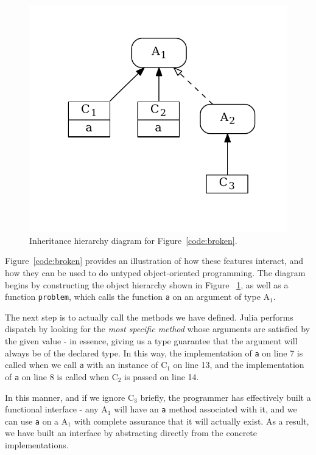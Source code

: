 \documentclass[preprint]{sigplanconf}
\newcommand{\xt}[1]{\texttt{#1}}
\newcommand{\cnum}[2]{$\text{#1}_#2$}
\begin{document}
\begin{figure}
\centering
\vspace{-1em}
\includegraphics[scale=.6]{example2.pdf}
\vspace{-2em}
\caption{Inheritance hierarchy diagram for Figure~\ref{code:broken}.}
\label{fig:algo}
\vspace{-1.3em}
\end{figure}
Figure~\ref{code:broken} provides an illustration of how these features 
interact, and how they can be used to do untyped object-oriented programming.
The diagram begins by constructing the object hierarchy shown in Figure~
\ref{fig:algo}, as well as a function \texttt{problem}, which calls the function 
\xt{a} on an argument of type $\text{A}_1$.

The next step is to actually call the methods we have defined. Julia performs
dispatch by looking for the \emph{most specific method} whose arguments are
satisfied by the given value - in essence, giving us a type guarantee that the
argument will always be of the declared type. In this way, the implementation 
of \xt{a} on line 7 is called when we call \xt{a} with an instance of $\text{C}_1$
on line 13, and the implementation of \xt{a} on line 8 is called when 
$\text{C}_2$ is passed on line 14.

In this manner, and if we ignore \cnum{C}{3} briefly, the programmer has 
effectively built a functional interface - any \cnum{A}{1} will have an \xt{a} 
method associated with it, and we can use \xt{a} on a \cnum{A}{1} with complete
assurance that it will actually exist. As a result, we have built an interface
by abstracting directly from the concrete implementations.
\end{document}
